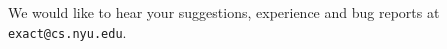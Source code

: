 \documentclass[12pt]{article}
\begin{document}
We would like to hear your suggestions, experience and bug reports
at 
	\mbox{\tt exact@cs.nyu.edu}.\\


\newpage
{\small


}
\end{document}
